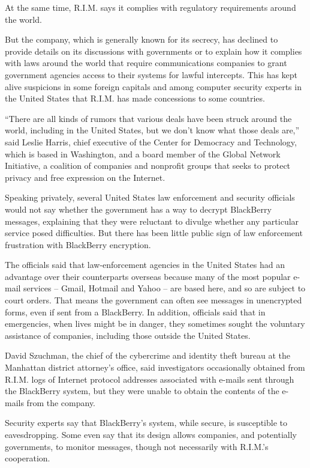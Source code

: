 ﻿\documentclass[12pt]{article}
\begin{document}
At the same time, R.I.M. says it complies with regulatory requirements around the world.

But the company, which is generally known for its secrecy, has declined to provide details on its
discussions with governments or to explain how it complies with laws around the world that require
communications companies to grant government agencies access to their systems for lawful intercepts.
This has kept alive suspicions in some foreign capitals and among computer security experts in the
United States that R.I.M. has made concessions to some countries.

``There are all kinds of rumors that various deals have been struck around the world, including in
the United States, but we don't know what those deals are,'' said Leslie Harris, chief executive of
the Center for Democracy and Technology, which is based in Washington, and a board member of the
Global Network Initiative, a coalition of companies and nonprofit groups that seeks to protect
privacy and free expression on the Internet.

Speaking privately, several United States law enforcement and security officials would not say
whether the government has a way to decrypt BlackBerry messages, explaining that they were reluctant
to divulge whether any particular service posed difficulties. But there has been little public sign
of law enforcement frustration with BlackBerry encryption.

The officials said that law-enforcement agencies in the United States had an advantage over their
counterparts overseas because many of the most popular e-mail services -- Gmail, Hotmail and Yahoo
-- are based here, and so are subject to court orders. That means the government can often see
messages in unencrypted forms, even if sent from a BlackBerry. In addition, officials said that in
emergencies, when lives might be in danger, they sometimes sought the voluntary assistance of
companies, including those outside the United States.

David Szuchman, the chief of the cybercrime and identity theft bureau at the Manhattan district
attorney's office, said investigators occasionally obtained from R.I.M. logs of Internet protocol
addresses associated with e-mails sent through the BlackBerry system, but they were unable to obtain
the contents of the e-mails from the company.

Security experts say that BlackBerry's system, while secure, is susceptible to eavesdropping. Some
even say that its design allows companies, and potentially governments, to monitor messages, though
not necessarily with R.I.M.'s cooperation.
\end{document}
